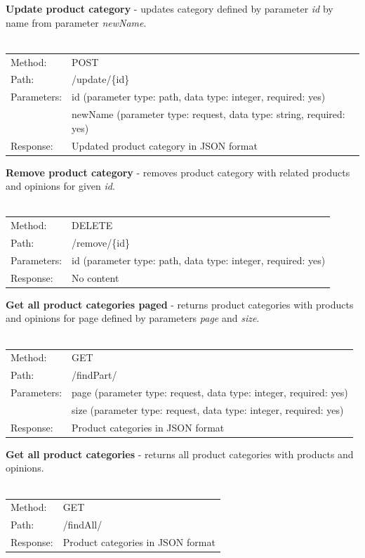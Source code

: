 \documentclass[10pt,a4paper]{article}
\begin{document}
\noindent\textbf{Update product category} - updates category defined by parameter \textit{id} by name from parameter \textit{newName}. \\
\\
  \begin{tabular}{ll}
  Method: & POST \\
  Path: & /update/\{id\} \\
  Parameters: & id (parameter type: path, data type: integer, required: yes)\\
              & newName (parameter type: request, data type: string, required: yes)\\
  Response: & Updated product category in JSON format  \\
  \end{tabular} \vspace{5mm}

\noindent\textbf{Remove product category} - removes product category with related products and opinions for given \textit{id}.\\
\\
  \begin{tabular}{ll}
  Method: & DELETE \\
  Path: & /remove/\{id\} \\
  Parameters: & id (parameter type: path, data type: integer, required: yes)\\
  Response: & No content  \\
  \end{tabular} \vspace{5mm}

\noindent\textbf{Get all product categories paged} - returns product categories with products and opinions for page defined by parameters \textit{page} and \textit{size}.\\
\\
  \begin{tabular}{ll}
  Method: & GET \\
  Path: & /findPart/ \\
  Parameters: & page (parameter type: request, data type: integer, required: yes)\\
              & size (parameter type: request, data type: integer, required: yes)\\
  Response: & Product categories in JSON format  \\
  \end{tabular} \vspace{5mm}
  
\noindent\textbf{Get all product categories} - returns all product categories with products and opinions.\\
\\
  \begin{tabular}{ll}
  Method: & GET \\
  Path: & /findAll/ \\
  Response: & Product categories in JSON format  \\
  \end{tabular} \vspace{5mm}
  
\end{document}
